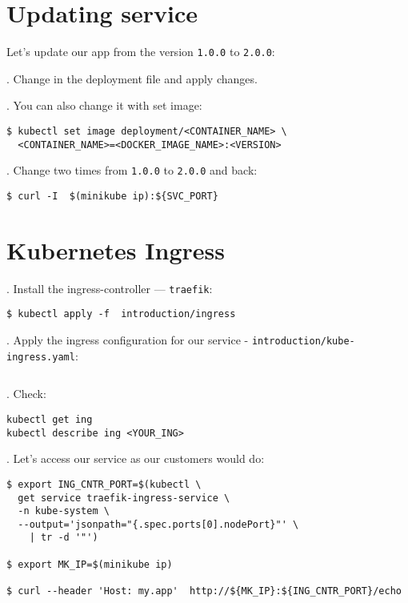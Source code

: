\documentclass[12pt, letterpaper]{article}
\begin{document}
%
%
%
\section{Updating service}

Let's update our app from the version \verb|1.0.0| to \verb|2.0.0|:

. Change in the deployment file and apply changes.

. You can also change it with set image:

\begin{verbatim}
$ kubectl set image deployment/<CONTAINER_NAME> \
  <CONTAINER_NAME>=<DOCKER_IMAGE_NAME>:<VERSION>
\end{verbatim}

. Change two times from \verb|1.0.0| to \verb|2.0.0| and back:

\begin{verbatim}
$ curl -I  $(minikube ip):${SVC_PORT}
\end{verbatim}

%
%
%
\pagebreak
\section{Kubernetes Ingress}

. Install the ingress-controller --- \verb|traefik|:

\begin{verbatim}
$ kubectl apply -f  introduction/ingress
\end{verbatim}

. Apply the ingress configuration for our service - \verb|introduction/kube-ingress.yaml|:
\inputminted{yaml}{introduction/kube-ingress.yaml}

. Check:

\begin{verbatim}
kubectl get ing
kubectl describe ing <YOUR_ING>
\end{verbatim}

. Let's access our service as our customers would do:

\begin{verbatim}
$ export ING_CNTR_PORT=$(kubectl \
  get service traefik-ingress-service \
  -n kube-system \
  --output='jsonpath="{.spec.ports[0].nodePort}"' \
    | tr -d '"')

$ export MK_IP=$(minikube ip)

$ curl --header 'Host: my.app'  http://${MK_IP}:${ING_CNTR_PORT}/echo

\end{verbatim}
\end{document}
